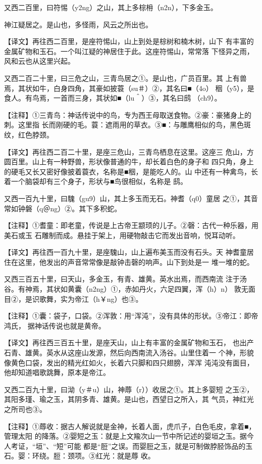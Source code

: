 \documentclass[a4paper,12pt,UTF8,twoside]{ctexbook}
\begin{document}
又西二百里，曰符惕（y2ng）之山，其上多棕枏（n2n），下多金玉。

神江疑居之。是山也，多怪雨，风云之所出也。

【译文】再往西二百里，是座符惕山，山上到处是棕树和楠木树，山下 有丰富的金属矿物和玉石。一个叫江疑的神居住于此。这座符惕山，常常落 下怪异之雨，风和云也从这里兴起。

又西二百二十里，曰三危之山，三青鸟居之①。是山也，广员百里。其 上有兽焉，其状如牛，白身四角，其豪如披蓑（su＃）②，其名曰■（4o） 秵（y5），是食人。有鸟焉，一首而三身，其状如■（lu＾）③，其名曰鸱 （ch9）。

【注释】①三青鸟：神话传说中的鸟，专为西王母取送食物。②豪：豪猪身上的刺。这里指 长而刚硬的毛。蓑：遮雨用的草衣。③■：与雕鹰相似的鸟，黑色斑纹，红色脖颈。

【译文】再往西二百二十里，是座三危山，三青鸟栖息在这里。这座三 危山，方圆百里。山上有一种野兽，形状像普通的牛，却长着白色的身子和 四只角，身上的硬毛又长又密好像披着蓑衣，名称是■秵，是能吃人的。山 中还有一种禽鸟，长着一个脑袋却有三个身子，形状与■鸟很相似，名称是 鸱。

又西一百九十里，曰騩（gu9）山，其上多玉而无石。神耆（q0）童居 之①，其音常如钟磐（q＠ng）②。其下多积蛇。

【注释】①耆童：即老童，传说是上古帝王颛顼的儿子。②磬：古代一种乐器，用美石或玉 石雕制而成。悬挂于架上，用硬物敲击它而发出音响，悦耳动听。

【译文】再往西一百九十里，是座騩山，山上遍布美玉而没有石头。天 神耆童居住在这里，他发出的声音常常像是敲钟击磬的响声。山下到处是一 堆一堆的蛇。

又西三百五十里，曰天山，多金玉，有青、雄黄。英水出焉，而西南流 注于汤谷。有神焉，其状如黄囊（n2ng）①，赤如丹火，六足四翼，浑（h）n） 敦无面目②，是识歌舞，实为帝江（h￥ng）也③。

【注释】①囊：袋子，口袋。②浑敦：用“浑沌”，没有具体的形状。③帝江：即帝鸿氏， 据神话传说也就是黄帝。

【译文】再往西三百五十里，是座天山，山上有丰富的金属矿物和玉石， 也出产石青、雄黄。英水从这座山发源，然后向西南流入汤谷。山里住着一 个神，形貌像黄色口袋，发出的精光红如火，长着六只脚和四只翅膀，浑浑 沌沌没有面目，他却知道唱歌跳舞，原本是帝江。

又西二百九十里，曰泑（y＃u）山，神蓐（r））收居之①。其上多婴短 之玉②，其阳多瑾、瑜之玉，其阴多青、雄黄。是山也，西望日之所入，其 气员，神红光之所司也③。

【注释】①蓐收：据古人解说就是金神，长着人面，虎爪子，白色毛皮，拿着■，管理太阳 的降落。②婴短之玉：就是上文羭次山一节中所记述的婴垣之玉。据今人考证，“垣”、“短”可能 都是“脰”之误。而婴脰之玉，就是可制做脖胫饰品的玉石。婴：环绕。脰：颈项。③红光：就是蓐 收。
\end{document}
